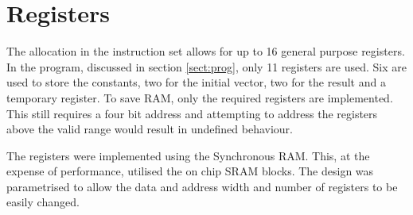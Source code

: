 
\section{Registers}\label{sect:regs}

The allocation in the instruction set allows for up to 16 general purpose registers. 
In the program, discussed in section \ref{sect:prog}, only 11 registers are used. 
Six are used to store the constants, two for the initial vector, two for the result and a temporary register.
To save RAM, only the required registers are implemented.
This still requires a four bit address and attempting to address the registers above the valid range would result in undefined behaviour.

The registers were implemented using the Synchronous RAM.
This, at the expense of performance, utilised the on chip SRAM blocks. 
The design was parametrised to allow the data and address width and number of registers to be easily changed. 

